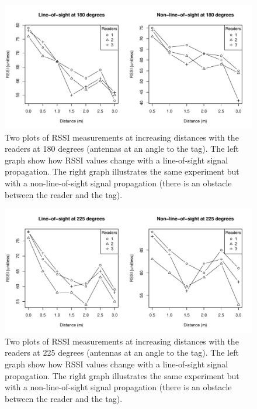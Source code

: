 \documentclass[a4paper,12pt]{article}
\begin{document}
\begin{figure}
	\begin{center}
		\includegraphics[width=1\textwidth]{rssi_distance_3m_180deg}
		\caption{Two plots of RSSI measurements at increasing distances with the readers at 180 degrees (antennas at an angle to the tag). The left graph show how RSSI values change with a line-of-sight signal propagation. The right graph illustrates the same experiment but with a non-line-of-sight signal propagation (there is an obstacle between the reader and the tag).}
	\end{center}
\end{figure}
\begin{figure}
	\begin{center}
		\includegraphics[width=1\textwidth]{rssi_distance_3m_225deg}
		\caption{Two plots of RSSI measurements at increasing distances with the readers at 225 degrees (antennas at an angle to the tag). The left graph show how RSSI values change with a line-of-sight signal propagation. The right graph illustrates the same experiment but with a non-line-of-sight signal propagation (there is an obstacle between the reader and the tag).}
	\end{center}
\end{figure}
\end{document}
